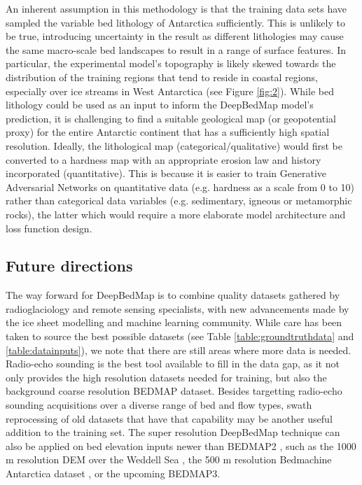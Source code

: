 \documentclass[tc, manuscript]{copernicus}
\begin{document}
An inherent assumption in this methodology is that the training data sets have sampled the variable bed lithology of Antarctica \citep{CoxGeoMAPdatasetAntarctic2018} sufficiently.
This is unlikely to be true, introducing uncertainty in the result as different lithologies may cause the same macro-scale bed landscapes to result in a range of surface features.
In particular, the experimental model's topography is likely skewed towards the distribution of the training regions that tend to reside in coastal regions, especially over ice streams in West Antarctica (see Figure \ref{fig:2}).
While bed lithology could be used as an input to inform the DeepBedMap model's prediction, it is challenging to find a suitable geological map (or geopotential proxy) \citep[see e.g.][]{AitkensubglacialgeologyWilkes2014,CoxGeoMAPdatasetAntarctic2018} for the entire Antarctic continent that has a sufficiently high spatial resolution.
Ideally, the lithological map (categorical/qualitative) would first be converted to a hardness map with an appropriate erosion law and history incorporated (quantitative).
This is because it is easier to train Generative Adversarial Networks on quantitative data (e.g. hardness as a scale from 0 to 10) rather than categorical data variables (e.g. sedimentary, igneous or metamorphic rocks), the latter which would require a more elaborate model architecture and loss function design.

\subsection{Future directions} \label{section:futuredirections}

The way forward for DeepBedMap is to combine quality datasets gathered by radioglaciology and remote sensing specialists, with new advancements made by the ice sheet modelling and machine learning community.
While care has been taken to source the best possible datasets (see Table \ref{table:groundtruthdata} and \ref{table:datainputs}), we note that there are still areas where more data is needed.
Radio-echo sounding is the best tool available to fill in the data gap, as it not only provides the high resolution datasets needed for training, but also the background coarse resolution BEDMAP dataset.
Besides targetting radio-echo sounding acquisitions over a diverse range of bed and flow types, swath reprocessing of old datasets that have that capability \citep{HolschuhLinkingpostglaciallandscapes2020} may be another useful addition to the training set.
The super resolution DeepBedMap technique can also be applied on bed elevation inputs newer than BEDMAP2 \citep{FretwellBedmap2improvedice2013}, such as the 1000 m resolution DEM over the Weddell Sea \citep{Jeofry1KmBedTopography2017}, the 500 m resolution Bedmachine Antarctica dataset \citep{MorlighemMEaSUREsBedMachineAntarctica2019}, or the upcoming BEDMAP3.
\end{document}
